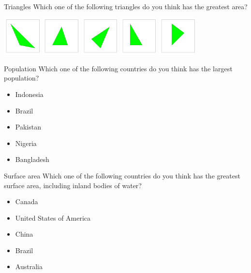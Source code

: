 \documentclass{beamer}
\begin{document}
\begin{frame}{Triangles}
	Which one of the following triangles do you think has the greatest area?

\vspace{0.5cm}
	\includegraphics[height=2cm]{Triangles1.pdf}
	\includegraphics[height=2cm]{Triangles2.pdf}
	\includegraphics[height=2cm]{Triangles3.pdf}
	\includegraphics[height=2cm]{Triangles4.pdf}
	\includegraphics[height=2cm]{Triangles5.pdf}	
\end{frame}

\begin{frame}{Population}
Which one of the following countries do you think has the largest population?

\begin{itemize}
	\item Indonesia
	\item Brazil
	\item Pakistan
	\item Nigeria
	\item Bangladesh
\end{itemize}
\end{frame}

\begin{frame}{Surface area}
Which one of the following countries do you think has the greatest surface area, including inland bodies of water?
	
\begin{itemize}
	\item Canada
	\item United States of America
	\item China
	\item Brazil
	\item Australia
\end{itemize}
\end{frame}
\end{document}
